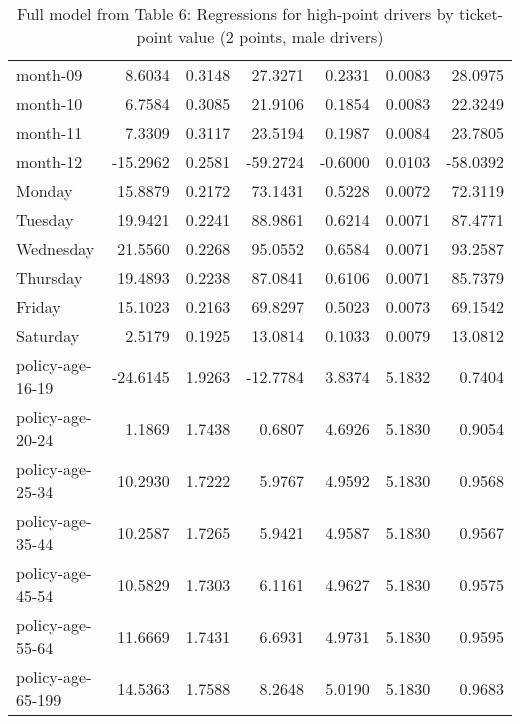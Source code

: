 \documentclass[10pt]{article}
\begin{document}
\begin{table}[ht]
\begin{tabular}{lrrrrrr}
  month-09 & 8.6034 & 0.3148 & 27.3271 & 0.2331 & 0.0083 & 28.0975 \\ 
  month-10 & 6.7584 & 0.3085 & 21.9106 & 0.1854 & 0.0083 & 22.3249 \\ 
  month-11 & 7.3309 & 0.3117 & 23.5194 & 0.1987 & 0.0084 & 23.7805 \\ 
  month-12 & -15.2962 & 0.2581 & -59.2724 & -0.6000 & 0.0103 & -58.0392 \\ 
  Monday & 15.8879 & 0.2172 & 73.1431 & 0.5228 & 0.0072 & 72.3119 \\ 
  Tuesday & 19.9421 & 0.2241 & 88.9861 & 0.6214 & 0.0071 & 87.4771 \\ 
  Wednesday & 21.5560 & 0.2268 & 95.0552 & 0.6584 & 0.0071 & 93.2587 \\ 
  Thursday & 19.4893 & 0.2238 & 87.0841 & 0.6106 & 0.0071 & 85.7379 \\ 
  Friday & 15.1023 & 0.2163 & 69.8297 & 0.5023 & 0.0073 & 69.1542 \\ 
  Saturday & 2.5179 & 0.1925 & 13.0814 & 0.1033 & 0.0079 & 13.0812 \\ 
  policy-age-16-19 & -24.6145 & 1.9263 & -12.7784 & 3.8374 & 5.1832 & 0.7404 \\ 
  policy-age-20-24 & 1.1869 & 1.7438 & 0.6807 & 4.6926 & 5.1830 & 0.9054 \\ 
  policy-age-25-34 & 10.2930 & 1.7222 & 5.9767 & 4.9592 & 5.1830 & 0.9568 \\ 
  policy-age-35-44 & 10.2587 & 1.7265 & 5.9421 & 4.9587 & 5.1830 & 0.9567 \\ 
  policy-age-45-54 & 10.5829 & 1.7303 & 6.1161 & 4.9627 & 5.1830 & 0.9575 \\ 
  policy-age-55-64 & 11.6669 & 1.7431 & 6.6931 & 4.9731 & 5.1830 & 0.9595 \\ 
  policy-age-65-199 & 14.5363 & 1.7588 & 8.2648 & 5.0190 & 5.1830 & 0.9683 \\ 
   \hline
\end{tabular}
\caption{Full model from Table 6: Regressions for high-point drivers by ticket-point value (2 points, male drivers)} 
\label{tab_6_2_pts_M}
\end{table}


\clearpage
\pagebreak



\end{document}
